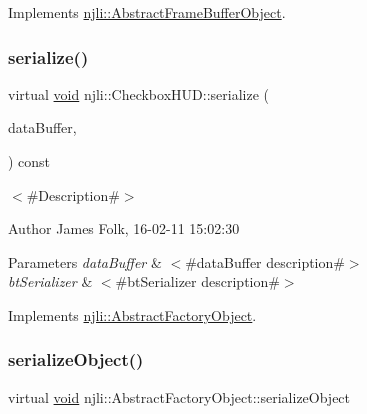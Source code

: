 Implements \mbox{\hyperlink{classnjli_1_1_abstract_frame_buffer_object_aa75a537f5745e4be8f749892d195b43c}{njli\+::\+Abstract\+Frame\+Buffer\+Object}}.

\mbox{\label{classnjli_1_1_checkbox_h_u_d_aa5edf29add89b86e7dd15ab5c91625f4}} 
\subsubsection{\texorpdfstring{serialize()}{serialize()}}
{\footnotesize\ttfamily virtual \mbox{\hyperlink{_thread_8h_af1e856da2e658414cb2456cb6f7ebc66}{void}} njli\+::\+Checkbox\+H\+U\+D\+::serialize (\begin{DoxyParamCaption}\item[{\mbox{\hyperlink{_thread_8h_af1e856da2e658414cb2456cb6f7ebc66}{void}} $\ast$}]{data\+Buffer,  }\item[{bt\+Serializer $\ast$}]{ }\end{DoxyParamCaption}) const\hspace{0.3cm}{\ttfamily [virtual]}}



$<$\#\+Description\#$>$ 

\begin{DoxyAuthor}{Author}
James Folk, 16-\/02-\/11 15\+:02\+:30
\end{DoxyAuthor}

\begin{DoxyParams}{Parameters}
{\em data\+Buffer} & $<$\#data\+Buffer description\#$>$ \\
\hline
{\em bt\+Serializer} & $<$\#bt\+Serializer description\#$>$ \\
\hline
\end{DoxyParams}


Implements \mbox{\hyperlink{classnjli_1_1_abstract_factory_object_aad2fbe86fb3bdecf02918a96b9c57976}{njli\+::\+Abstract\+Factory\+Object}}.

\mbox{\label{classnjli_1_1_checkbox_h_u_d_a4fc4bcd9d1930911474210c047372fc0}} 
\subsubsection{\texorpdfstring{serialize\+Object()}{serializeObject()}}
{\footnotesize\ttfamily virtual \mbox{\hyperlink{_thread_8h_af1e856da2e658414cb2456cb6f7ebc66}{void}} njli\+::\+Abstract\+Factory\+Object\+::serialize\+Object}

